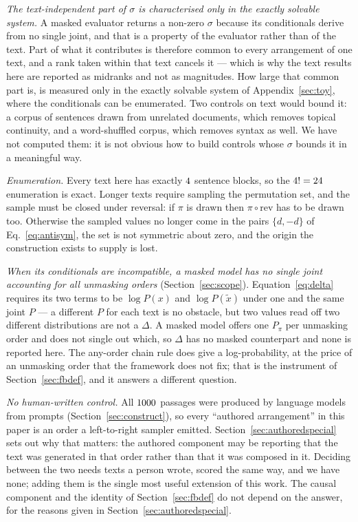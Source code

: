\documentclass[11pt]{article}
\begin{document}
\emph{The text-independent part of $\sigma$ is characterised only in the
exactly solvable system.}  A masked evaluator returns a non-zero $\sigma$
because its conditionals derive from no single joint, and that is a property
of the evaluator rather than of the text.  Part of what it contributes is
therefore common to every arrangement of one text, and a rank taken within
that text cancels it --- which is why the text results here are reported as
midranks and not as magnitudes.  How large that common part is, is measured
only in the exactly solvable system of Appendix~\ref{sec:toy}, where the
conditionals can be enumerated.  Two controls on text would bound it: a
corpus of sentences drawn from unrelated documents, which removes topical
continuity, and a word-shuffled corpus, which removes syntax as well.  We
have not computed them: it is not obvious how to build controls whose
$\sigma$ bounds it in a meaningful way.

\emph{Enumeration.}  Every text here has exactly $4$ sentence blocks, so
the $4! = 24$ enumeration is exact.  Longer texts require sampling the permutation
set, and the sample must be closed under reversal: if $\pi$ is drawn then
$\pi\circ\mathrm{rev}$ has to be drawn too.  Otherwise the sampled values
no longer come in the pairs $\{d, -d\}$ of Eq.~\eqref{eq:antisym}, the set
is not symmetric about zero, and the origin the construction exists to
supply is lost.

\emph{When its conditionals are incompatible, a masked model has no single
joint accounting for all unmasking orders} (Section~\ref{sec:scope}).
Equation~\eqref{eq:delta} requires its two terms to be $\log P(x)$ and
$\log P(\tilde{x})$ under one and the same joint $P$ --- a different $P$ for
each text is no obstacle, but two values read off two different
distributions are not a $\Delta$.  A masked model offers one $P_\pi$ per
unmasking order and does not single out which, so $\Delta$ has no masked
counterpart and none is reported here.  The any-order chain rule does give a
log-probability, at the price of an unmasking order that the framework does
not fix; that is the instrument of Section~\ref{sec:fbdef}, and it answers a
different question.

\emph{No human-written control.}  All $1000$ passages were produced
by language models from prompts (Section~\ref{sec:construct}), so every
``authored arrangement'' in this paper is an order a left-to-right sampler
emitted.  Section~\ref{sec:authoredspecial} sets out why that matters: the
authored component may be reporting that the text was generated in that
order rather than that it was composed in it.  Deciding between the two
needs texts a person wrote, scored the same way, and we have none; adding
them is the single most useful extension of this work.  The causal
component and the identity of Section~\ref{sec:fbdef} do not depend on the
answer, for the reasons given in Section~\ref{sec:authoredspecial}.
\end{document}
